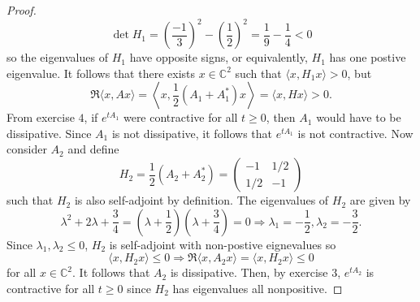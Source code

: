 \documentclass{exam}
\newcommand{\CC}{\mathbb C}
\begin{document}
\begin{questions}
\begin{solution}
\begin{proof}
            \[
                \det H_1 = \left(\frac{-1}{3}\right)^2 - \left(\frac{1}{2}\right)^2 = \frac{1}{9} - \frac{1}{4} < 0
            \]
            so the eigenvalues of $H_1$ have opposite signs, or equivalently, $H_1$ has one postive eigenvalue. It follows that there exists $x \in \CC^2$ such that $\langle x, H_1 x\rangle > 0$, but 
            \[
                \Re\langle x, Ax\rangle = \left\langle x, \frac{1}{2}\left(A_1 + A_1^*\right)x \right\rangle = \langle x, Hx \rangle > 0.
            \]
            From exercise $4$, if $e^{tA_{1}}$ were contractive for all $t \geq 0$, then $A_1$ would have to be dissipative. Since $A_1$ is not dissipative, it follows that $e^{tA_{1}}$ is not contractive. Now consider $A_2$ and define 
            \[
                H_2 = \frac{1}{2}\left(A_2 + A_2^*\right) = \begin{pmatrix}
                    -1 & 1/2 \\
                    1/2 & -1 
                \end{pmatrix}
            \]
            such that $H_2$ is also self-adjoint by definition. The eigenvalues of $H_2$ are given by 
            \[
                \lambda^2 + 2\lambda + \frac{3}{4} = \left(\lambda + \frac{1}{2}\right)\left(\lambda + \frac{3}{4}\right) = 0 \Rightarrow \lambda_1 = -\frac{1}{2}, \lambda_2 = -\frac{3}{2}.
            \]
            Since $\lambda_1, \lambda_2 \leq 0$, $H_2$ is self-adjoint with non-postive eignevalues so 
            \[
                \langle x, H_2 x\rangle \leq 0 \Rightarrow \Re\langle x, A_{2}x \rangle = \langle x, H_{2}x \rangle \leq 0 
            \]
            for all $x \in \CC^2$. It follows that $A_2$ is dissipative. Then, by exercise $3$, $e^{tA_{2}}$ is contractive for all $t \geq 0$ since $H_2$ has eigenvalues all nonpositive.
            \end{proof}
        \end{solution}
    \end{questions}

\end{document}
